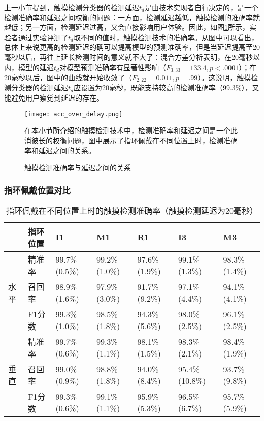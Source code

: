上一小节提到，触摸检测分类器的检测延迟$t_d$是由技术实现者自行决定的，是一个检测准确率和延迟之间权衡的问题：一方面，检测延迟越低，触摸检测的准确率就越低；另一方面，检测延迟过高，又会直接影响用户体验。因此，如图\ref{fig:acc_over_delay}所示，实验者通过实验评测了$t_d$取不同的值时，触摸检测技术的准确率。从图中可以看出，总体上来说更高的检测延迟的确可以提高模型的预测准确率，但是当延迟提高至20毫秒以后，再往上延长检测时间的意义就不大了：混合方差分析表明，在20毫秒以内，模型的延迟$t_d$对模型预测准确率有显著性影响（$F_{3,33}=133.4,p<.0001$）；在20毫秒以后，图中的曲线就开始收敛了（$F_{2,22}=0.011,p=.99$）。这说明，触摸检测分类器的检测延迟$t_d$应设置为20毫秒，既能支持较高的检测准确率（99.3\%），又能避免用户察觉到延迟的存在。

\begin{figure}
	\centering
	\texttt{[image: acc\_over\_delay.png]}
	\caption*{在本小节所介绍的触摸检测技术中，检测准确率和延迟之间是一个此消彼长的权衡问题，图中展示了指环佩戴在不同位置上时，检测准确率和延迟之间的关系。}
	\caption{触摸检测准确率与延迟之间的关系}
	\label{fig:acc_over_delay}
\end{figure}

\subsubsection{指环佩戴位置对比}

\begin{table}[!htbp]
	\centering
	\begin{tabular}{ll|l|l|l|l|l}
		\toprule
		& 指环位置 & I1               & M1            & R1            & I3             & M3            \\
		\midrule
		\multirow{3}{*}{水平} & 精准率 & 99.7\%(0.5\%) & 99.2\%(1.0\%) & 97.6\%(1.9\%) & 99.1\%(1.3\%)  & 98.3\%(1.4\%) \\
		& 召回率    & 98.9\%(1.6\%)    & 97.9\%(3.0\%) & 91.7\%(9.2\%) & 97.1\%(4.4\%)  & 94.1\%(4.1\%) \\
		& F1分数  & 99.3\%(1.0\%)    & 98.5\%(1.8\%) & 94.3\%(5.6\%) & 98.0\%(2.5\%)  & 96.1\%(2.5\%) \\ \hline
		\multirow{3}{*}{垂直}   & 精准率 & 99.7\%(0.6\%)    & 99.3\%(1.1\%) & 98.1\%(1.5\%) & 98.3\%(2.1\%)  & 98.4\%(1.9\%) \\
		& 召回率    & 99.0\%(0.9\%)    & 98.8\%(1.8\%) & 94.0\%(8.4\%) & 95.4\%(10.8\%) & 93.7\%(9.8\%) \\
		& F1分数  & 99.3\%(0.6\%)    & 99.1\%(1.1\%) & 95.9\%(5.3\%) & 96.5\%(6.7\%)  & 95.7\%(5.9\%) \\
		\bottomrule
	\end{tabular}
	\caption{指环佩戴在不同位置上时的触摸检测准确率（触摸检测延迟为20毫秒）}
	\label{tab:acc_over_placement}
\end{table}

